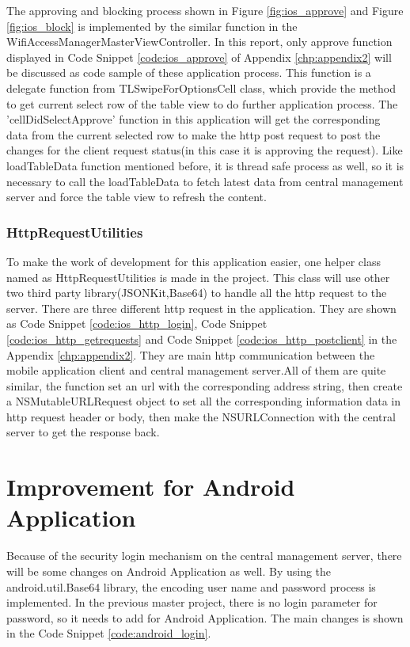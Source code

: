 \par The approving and blocking process shown in Figure \ref{fig:ios_approve} and Figure \ref{fig:ios_block} is implemented by the similar function in the WifiAccessManagerMasterViewController. In this report, only approve function displayed in Code Snippet \ref{code:ios_approve} of Appendix \ref{chp:appendix2} will be discussed as code sample of these application process. This function is a delegate function from TLSwipeForOptionsCell class, which provide the method to get current select row of the table view to do further application process. The 'cellDidSelectApprove' function in this application will get the corresponding data from the current selected row to make the \gls{http} post request to post the changes for the client request status(in this case it is approving the request). Like loadTableData function mentioned before, it is thread safe process as well, so it is necessary to call the loadTableData to fetch latest data from central management server and force the table view to refresh the content.

\subsubsection{HttpRequestUtilities}
\par To make the work of development for this application easier, one helper class named as HttpRequestUtilities is made in the project. This class will use other two third party library(JSONKit,Base64) to handle all the \gls{http} request to the server. There are three different \gls{http} request in the application. They are shown as Code Snippet \ref{code:ios_http_login}, Code Snippet \ref{code:ios_http_getrequests} and Code Snippet \ref{code:ios_http_postclient} in the Appendix \ref{chp:appendix2}. They are main \gls{http} communication between the mobile application client and central management server.All of them are quite similar, the function set an \gls{url} with the corresponding address string, then create a  NSMutableURLRequest object to set all the corresponding information data in \gls{http} request header or body, then make the NSURLConnection with the central server to get the response back.

\section{Improvement for Android Application}
\par Because of the security login mechanism on the central management server, there will be some changes on Android Application as well. By using the android.util.Base64 library, the encoding user name and password process is implemented. In the previous master project, there is no login parameter for password, so it needs to add for Android Application. The main changes is shown in the Code Snippet \ref{code:android_login}.

